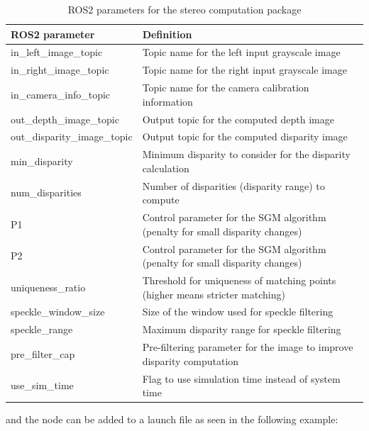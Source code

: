 \begin{table}[H]
  \begin{tabular}{|l|l|}
  \hline
  ROS2 parameter               & Definition                                                                    \\ \hline
  in\_left\_image\_topic       & Topic name for the left input grayscale image                                 \\ \hline
  in\_right\_image\_topic      & Topic name for the right input grayscale image                                \\ \hline
  in\_camera\_info\_topic      & Topic name for the camera calibration information                             \\ \hline
  out\_depth\_image\_topic     & Output topic for the computed depth image                                     \\ \hline
  out\_disparity\_image\_topic & Output topic for the computed disparity image                                 \\ \hline
  min\_disparity               & Minimum disparity to consider for the disparity calculation                   \\ \hline
  num\_disparities             & Number of disparities (disparity range) to compute                            \\ \hline
  P1                           & Control parameter for the SGM algorithm (penalty for small disparity changes) \\ \hline
  P2                           & Control parameter for the SGM algorithm (penalty for small disparity changes) \\ \hline
  uniqueness\_ratio            & Threshold for uniqueness of matching points (higher means stricter matching)  \\ \hline
  speckle\_window\_size        & Size of the window used for speckle filtering                                 \\ \hline
  speckle\_range               & Maximum disparity range for speckle filtering                                 \\ \hline
  pre\_filter\_cap             & Pre-filtering parameter for the image to improve disparity computation        \\ \hline
  use\_sim\_time               & Flag to use simulation time instead of system time                            \\ \hline
  \end{tabular}
  \caption{ROS2 parameters for the stereo computation package}\label{tab:stereo_computation_params}
\end{table}
and the node can be added to a launch file as seen in the following example:

